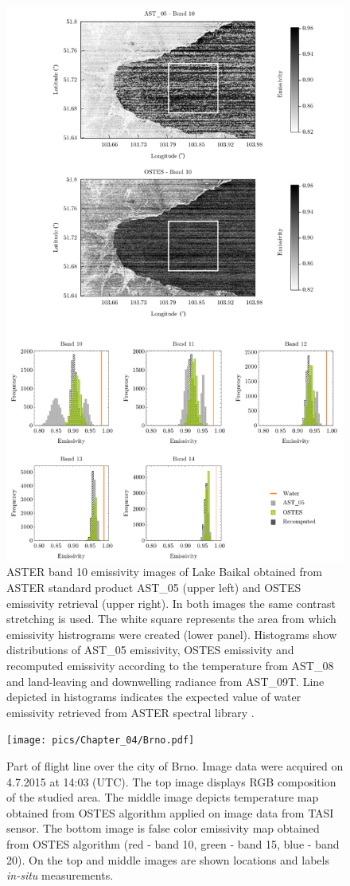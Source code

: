 \begin{figure}[!h]
\centering
\includegraphics[width=0.76\linewidth]{pics/Chapter_04/Baikal.pdf}
\vspace{1.5 em}
\caption{
ASTER band 10 emissivity images of Lake Baikal obtained from ASTER standard product AST\_05 (upper left) and OSTES emissivity retrieval (upper right). In both images the same contrast stretching is used. The white square represents the area from which emissivity histrograms were created (lower panel). Histograms show distributions of AST\_05 emissivity, OSTES emissivity and recomputed emissivity according to the temperature from AST\_08 and land-leaving and downwelling radiance from AST\_09T. Line depicted in histograms indicates the expected value of water emissivity retrieved from ASTER spectral library \cite{BH09}.}
\label{fig:Bajkal}
\end{figure}

\begin{figure}[!t]
\centering
\vspace{0.8 em}
\texttt{[image: pics/Chapter\_04/Brno.pdf]}
\vspace{2 em}
\caption{
Part of flight line over the city of Brno. Image data were acquired on 4.7.2015 at 14:03 (UTC). The top image displays RGB composition of the studied area. The middle image depicts temperature map obtained from OSTES algorithm applied on image data from TASI sensor. The bottom image is false color emissivity map obtained from OSTES algorithm (red - band 10, green - band 15, blue - band 20). On the top and middle images are shown locations and labels \textit{in-situ} measurements.}
\label{fig:Brno}
\end{figure}

